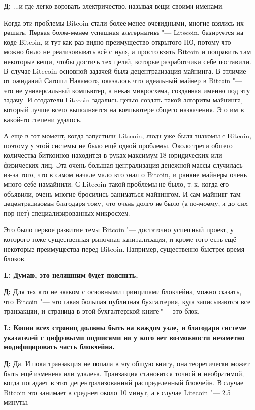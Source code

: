 \documentclass[10pt, a5paper]{article}
\begin{document}
{\noindent \bf Д:} ...и где легко воровать электричество, называя вещи своими именами.

Когда эти проблемы Bitcoin стали более-менее очевидными, многие взялись их решать. Первая более-менее успешная альтернатива "--- Litecoin, базируется на коде Bitcoin, и тут как раз видно преимущество открытого ПО, потому что можно было не реализовывать всё с нуля, а просто взять Bitcoin и поправить там некоторые вещи, чтобы достичь тех целей, которые разработчики себе поставили. В случае Litecoin основной задачей была децентрализация майнинга. В отличие от ожиданий Сатоши Накамото, оказалось что идеальный майнер в Bitcoin "--- это не универсальный компьютер, а некая микросхема, созданная именно под эту задачу. И создатели Litecoin задались целью создать такой алгоритм майнинга, который лучше всего выполняется на компьютере общего назначения. Это им в какой-то степени удалось. 

А еще в тот момент, когда запустили Litecoin, люди уже были знакомы с Bitcoin, поэтому у этой системы не было ещё одной проблемы. Около трети общего количества биткоинов находится в руках максимум 18 юридических или физических лиц. Эта очень большая централизация денежной массы случилась из-за того, что в самом начале мало кто знал о Bitcoin, и ранние майнеры очень много себе намайнили. С Litecoin такой проблемы не было, т. к. когда его объявили, очень многие бросились заниматься майнингом. И сам майнинг там децентрализован благодаря тому, что очень долго не было (а по-моему, и до сих пор нет) специализированных микросхем. 

Это было первое развитие темы Bitcoin "--- достаточно успешный проект, у которого тоже существенная рыночная капитализация, и кроме того есть ещё некоторые преимущества перед Bitcoin. Например, существенно быстрее время блоков. 


{\noindent \bf L: Думаю, это нелишним будет пояснить.}

{\noindent \bf Д:} Для тех кто не знаком с основными принципами блокчейна, можно сказать, что Bitcoin "--- это такая большая публичная бухгалтерия, куда записываются все транзакции, и страница в этой бухгалтерской книге "--- это блок.

{\noindent \bf L: Копии всех страниц должны быть на каждом узле, и благодаря системе указателей с цифровыми подписями ни у кого нет возможности незаметно модифицировать часть блокчейна.}

{\noindent \bf Д:} Да. И пока транзакция не попала в эту общую книгу, она теоретически может быть ещё изменена или удалена. Транзакция становится точной и необратимой, когда попадает в этот децентрализованный распределенный блокчейн. В случае Bitcoin это занимает в среднем около 10 минут, а в случае Litecoin "--- 2.5 минуты. 
\end{document}

